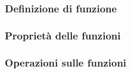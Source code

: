 \subsubsection{Definizione di funzione}



\subsubsection{Proprietà delle funzioni}



\subsubsection{Operazioni sulle funzioni}

